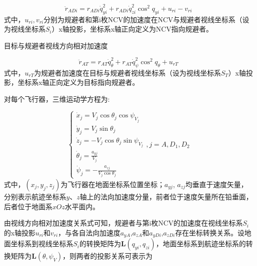\begin{equation}
\label{eq:3}
{\ddot r_{ADi}} = {r_{ADi}}\dot q_{yi}^2 + {r_{ADi}}\dot q_{zi}^2{\cos ^2}{q_{yi}} + {u_{ri}} - {v_{ri}}
\end{equation}
式中，${u_{ri}},{v_{ri}}$分别为规避者和第i枚NCV的加速度在NCV与规避者视线坐标系（设为视线坐标系${S_i}$）x轴投影，坐标系x轴正向定义为NCV指向规避者。

目标与规避者视线方向相对加速度

\begin{equation}
\label{eq:4}
{\ddot r_{AT}} = {r_{AT}}\dot q_\theta ^2 + {r_{AT}}\dot q_\psi ^2{\cos ^2}{q_\theta } + {u_{rT}}
\end{equation}
式中，${u_{rT}}$为规避者加速度在目标与规避者视线坐标系（设为视线坐标系${S_T}$）x轴投影，坐标系x轴正向定义为目标指向规避者。

对每个飞行器，三维运动学方程为:

\begin{equation}
\label{eq:5}
\left\{ {\begin{array}{*{20}{l}}
  {{{\dot x}_j} = {V_j}\cos {\theta _j}\cos {\psi _{{V_j}}}} \\ 
  {{{\dot y}_j} = {V_j}\sin {\theta _j}} \\ 
  {{{\dot z}_j} =  - {V_j}\cos {\theta _j}\sin {\psi _{{V_j}}}} \\ 
  {{{\dot \theta }_j} = \frac{{{a_{yj}}}}{{{V_j}}}} \\ 
  {{{\dot \psi }_j} =  - \frac{{{a_{zj}}}}{{{V_j}\cos {\theta _j}}}} 
\end{array},j = A,{D_1},{D_2}} \right.
\end{equation}
式中，$({x_j},{y_j},{z_j})$为飞行器在地面坐标系位置坐标；${a_{yj}}$, ${a_{zj}}$均垂直于速度矢量，分别表示航迹坐标系$y$、$z$轴上的法向加速度分量，前者位于速度矢量所在铅垂面，后者位于地面系$xOz$水平面内。

由视线方向相对加速度关系式可知，规避者与第i枚NCV的加速度在视线坐标系${S_i}$的x轴投影${u_{ri}}$和${v_{ri}}$，与各自法向加速度${a_{yA}}$,${a_{zA}}$和${a_{yDi}}$,${a_{zDi}}$存在坐标转换关系。设地面坐标系到视线坐标系${S_i}$的转换矩阵为${\mathbf{L}}({q_{yi}},{q_{zi}})$，地面坐标系到航迹坐标系的转换矩阵为${\mathbf{L}}(\theta ,{\psi _V})$，则两者的投影关系可表示为

